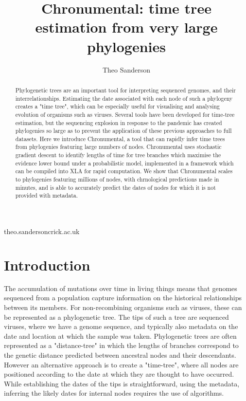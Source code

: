 
\title{Chronumental: time tree estimation from very large phylogenies}

\author[1,2]{Theo Sanderson}

\date{}

\maketitle

\begin{abstract}
Phylogenetic trees are an important tool for interpreting sequenced genomes, and their interrelationships. Estimating the date associated with each node of such a phylogeny creates a "time tree", which can be especially useful for visualising and analysing evolution of organisms such as viruses. Several tools have been developed for time-tree estimation, but the sequencing explosion in response to the pandemic has created phylogenies so large as to prevent the application of these previous approaches to full datasets. Here we introduce Chronumental, a tool that can rapidly infer time trees from phylogenies featuring large numbers of nodes. Chronumental uses stochastic gradient descent to identify lengths of time for tree branches which maximise the evidence lower bound under a probabilistic model, implemented in a framework which can be compiled into XLA for rapid computation. We show that Chronumental scales to phylogenies featuring millions of nodes, with chrnological predictions made in minutes, and is able to accurately predict the dates of nodes for which it is not provided with metadata.
\end{abstract}

\begin{corrauthor}
theo.sanderson\at crick.ac.uk
\end{corrauthor}



\section*{Introduction}\label{s:introduction}
The accumulation of mutations over time in living things means that genomes sequenced from a population capture information on the historical relationships between its members. For non-recombining organisms such as viruses, these can be represented as a phylogenetic tree. The tips of such a tree are sequenced viruses, where we have a genome sequence, and typically also metadata on the date and location at which the sample was taken. Phylogenetic trees are often represented as a "distance-tree" in which the lengths of branches correspond to the genetic distance predicted between ancestral nodes and their descendants. However an alternative approach is to create a "time-tree", where all nodes are positioned according to the date at which they are thought to have occurred. While establishing the dates of the tips is straightforward, using the metadata, inferring the likely dates for internal nodes requires the use of algorithms.



